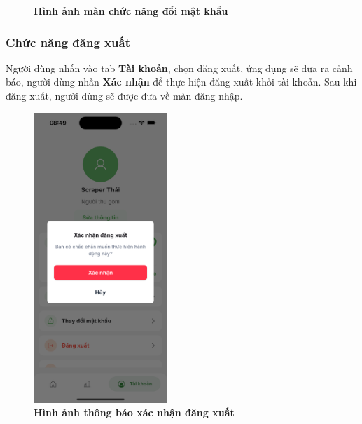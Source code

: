 \begin{figure}[H]
  \caption[Hình ảnh màn chức năng đổi mật khẩu]{\bfseries \fontsize{12pt}{0pt}
  \selectfont Hình ảnh màn chức năng đổi mật khẩu}
  \label{change_password_waznet}
\end{figure}
\subsubsection{Chức năng đăng xuất}
Người dùng nhấn vào tab \textbf{Tài khoản}, chọn đăng xuất, ứng dụng sẽ đưa ra cảnh báo, người dùng nhấn \textbf{Xác nhận} để thực hiện đăng xuất khỏi tài khoản. Sau khi đăng xuất, người dùng sẽ được đưa về màn đăng nhập.
\begin{figure}[H]
  \centering
  \includegraphics[width=0.45\textwidth]{Images/mobile/logout_dialog.png}
  \caption[Hình ảnh thông báo xác nhận đăng xuất]{\bfseries \fontsize{12pt}{0pt}
  \selectfont Hình ảnh thông báo xác nhận đăng xuất}
  \label{logout_dialog} %
\end{figure}
